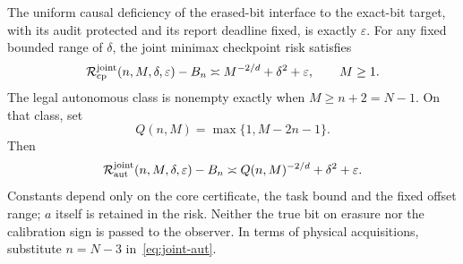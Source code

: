 \begin{theorem}\label{thm:joint}
The uniform causal deficiency of the erased-bit interface to the exact-bit target, with its audit protected and its report deadline fixed, is exactly $\varepsilon$. For any fixed bounded range of $\delta$, the joint minimax checkpoint risk satisfies
\begin{equation}\label{eq:joint-cp}
 \mathcal R^{\rm joint}_{\rm cp}(n,M,\delta,\varepsilon)-B_n
 \asymp M^{-2/d}+\delta^2+\varepsilon,
 \qquad M\ge1.
\end{equation}
The legal autonomous class is nonempty exactly when $M\ge n+2=N-1$. On that class, set
\[
 Q(n,M)=\max\{1,M-2n-1\}.
\]
Then
\begin{equation}\label{eq:joint-aut}
 \mathcal R^{\rm joint}_{\rm aut}(n,M,\delta,\varepsilon)-B_n
 \asymp Q(n,M)^{-2/d}+\delta^2+\varepsilon.
\end{equation}
Constants depend only on the core certificate, the task bound and the fixed offset range; $a$ itself is retained in the risk. Neither the true bit on erasure nor the calibration sign is passed to the observer. In terms of physical acquisitions, substitute $n=N-3$ in~\eqref{eq:joint-aut}.
\end{theorem}
